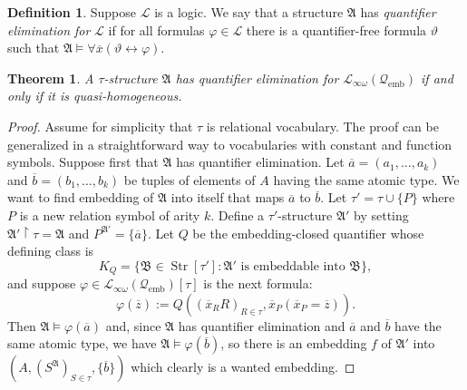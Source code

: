 \documentclass{ndjflart}
\theoremstyle{plain}
\newtheorem{theorem}[conjecture]{Theorem}
\theoremstyle{definition}
\newtheorem{definition}[conjecture]{Definition}
\numberwithin{equation}{section}
\DeclareMathOperator{\emb}{emb}
\DeclareMathOperator{\Str}{Str}
\begin{document}
\begin{definition}
Suppose $\mathcal{L}$ is a logic.
We say that a structure $\mathfrak{A}$ has \emph{quantifier elimination for}
$\mathcal{L}$ if for all formulas $\varphi \in \mathcal{L}$ there is a
quantifier-free formula $\vartheta$ such that
$\mathfrak{A} \vDash \forall \overline{x}(\vartheta \leftrightarrow \varphi)$.
\end{definition}

\begin{theorem}\label{homog}
A $\tau$-structure $\mathfrak{A}$ has quantifier elimination for
$\mathcal{L}_{\infty\omega}(\mathcal{Q}_{\emb})$ if and only if it is
quasi-homogeneous.
\end{theorem}
\begin{proof}
Assume for simplicity that $\tau$ is relational vocabulary.
The proof can be generalized in a straightforward way to vocabularies with
constant and function symbols.
Suppose first that $\mathfrak{A}$ has quantifier elimination.
Let $\overline{a} = (a_1,\dots,a_k)$ and $\overline{b} = (b_1,\dots,b_k)$ be
tuples of elements of $A$ having the same atomic type.
We want to find embedding of $\mathfrak{A}$ into itself that maps
$\overline{a}$ to $\overline{b}$.
Let $\tau' = \tau \cup \{P\}$ where $P$ is a new relation symbol of arity $k$.
Define a $\tau'$-structure $\mathfrak{A}'$ by setting
$\mathfrak{A}'\upharpoonright \tau = \mathfrak{A}$ and
$P^{\mathfrak{A}'} = \{\overline{a}\}$.
Let $Q$ be the embedding-closed quantifier whose defining class is
\[
	K_Q = \{\mathfrak{B} \in \Str[\tau'] \colon \mathfrak{A}'
	\text{ is embeddable into } \mathfrak{B}\},
\]
and suppose $\varphi \in \mathcal{L}_{\infty\omega}(\mathcal{Q}_{\emb})[\tau]$
is the next formula:
\[
	\varphi(\overline{z}) :=
	Q((\overline{x}_RR)_{R\in\tau},\overline{x}_P(\overline{x}_P=\overline{z})).
\]
Then $\mathfrak{A} \vDash \varphi(\overline{a})$ and, since $\mathfrak{A}$ has
quantifier elimination and $\overline{a}$ and $\overline{b}$ have the same
atomic type, we have $\mathfrak{A} \vDash \varphi(\overline{b})$, so there is an
embedding $f$ of $\mathfrak{A}'$ into
$(A,(S^{\mathfrak{A}})_{S\in\tau}, \{\overline{b}\})$ which clearly is a wanted
embedding.


\end{proof}
\end{document}
